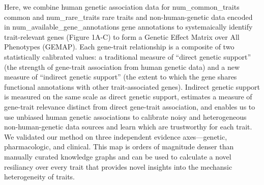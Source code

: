 Here, we combine human genetic association data for {{num_common_traits}} common and {{num_rare_traits}} rare traits and non-human-genetic data encoded in {{num_available_gene_annotations}} gene annotations to systemaically identify trait-relevant genes (Figure 1A-C) to form a Genetic Effect Matrix over All Phenotypes (GEMAP). Each gene-trait relationship is a composite of two statistically calibrated values: a traditional measure of  ``direct genetic support'' (the strength of gene-trait association from human genetic data) and a new  measure of ``indirect genetic support'' (the extent to which the gene shares functional annotations with other trait-associated genes). Indirect genetic support is measured on the same scale as direct genetic support, estimates a measure of gene-trait relevance distinct from direct gene-trait association, and enables us to use unbiased human genetic associations to calibrate noisy and heterogeneous non-human-genetic data sources and learn which are trustworthy for each trait. We validated our method on three independent evidence axes—genetic, pharmacologic, and clinical. This map is orders of magnitude denser than manually curated knowledge graphs and can be used to calculate a novel resiliancy over every trait that provides novel insights into the mechansic heterogeneity of traits. 



